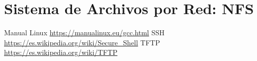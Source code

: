 \documentclass[12pt]{article}
\begin{document}
\section{Sistema de Archivos por Red: NFS}
\newpage
\begin{thebibliography}{99}
 Manual Linux \url{https://manualinux.eu/gcc.html}
 SSH \url{https://es.wikipedia.org/wiki/Secure_Shell}
 TFTP \url{https://es.wikipedia.org/wiki/TFTP}
\end{thebibliography}
\end{document}
